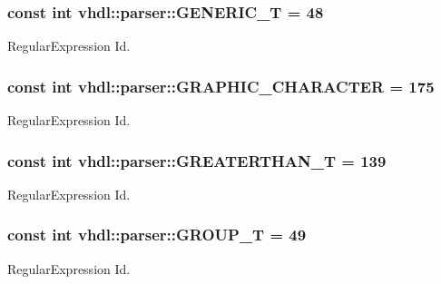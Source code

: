 \subsubsection[{G\+E\+N\+E\+R\+I\+C\+\_\+\+T}]{\setlength{\rightskip}{0pt plus 5cm}const int vhdl\+::parser\+::\+G\+E\+N\+E\+R\+I\+C\+\_\+\+T = 48}\label{namespacevhdl_1_1parser_a35936c8a9c66fe087114a4b18bf81c60}
Regular\+Expression Id. \hypertarget{namespacevhdl_1_1parser_a45ce6a1bd1866403342fe68825963023}{}
\subsubsection[{G\+R\+A\+P\+H\+I\+C\+\_\+\+C\+H\+A\+R\+A\+C\+T\+E\+R}]{\setlength{\rightskip}{0pt plus 5cm}const int vhdl\+::parser\+::\+G\+R\+A\+P\+H\+I\+C\+\_\+\+C\+H\+A\+R\+A\+C\+T\+E\+R = 175}\label{namespacevhdl_1_1parser_a45ce6a1bd1866403342fe68825963023}
Regular\+Expression Id. \hypertarget{namespacevhdl_1_1parser_a8ffbd29e73eaab332d74cb286daee369}{}
\subsubsection[{G\+R\+E\+A\+T\+E\+R\+T\+H\+A\+N\+\_\+\+T}]{\setlength{\rightskip}{0pt plus 5cm}const int vhdl\+::parser\+::\+G\+R\+E\+A\+T\+E\+R\+T\+H\+A\+N\+\_\+\+T = 139}\label{namespacevhdl_1_1parser_a8ffbd29e73eaab332d74cb286daee369}
Regular\+Expression Id. \hypertarget{namespacevhdl_1_1parser_a107d7e4ce00272ff998f7f79d82240d7}{}
\subsubsection[{G\+R\+O\+U\+P\+\_\+\+T}]{\setlength{\rightskip}{0pt plus 5cm}const int vhdl\+::parser\+::\+G\+R\+O\+U\+P\+\_\+\+T = 49}\label{namespacevhdl_1_1parser_a107d7e4ce00272ff998f7f79d82240d7}
Regular\+Expression Id. \hypertarget{namespacevhdl_1_1parser_a72a2b40c0bac0d01ab8bfac7ccd9d670}{}
